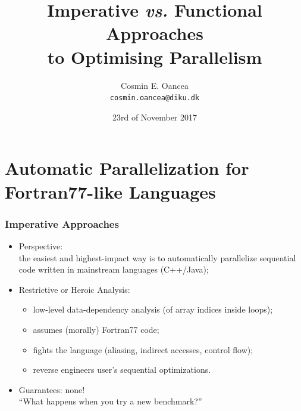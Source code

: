\documentclass{beamer}
\title[]{Imperative {\em vs.} Functional Approaches\\ to Optimising Parallelism}
\author[]{Cosmin E. Oancea\\{\tt cosmin.oancea@diku.dk}}
\institute{Department of Computer Science (DIKU)\\University of Copenhagen}
\date[23/11/2017]{23rd of November 2017}
\newcommand{\emphh}[1]{\textcolor{CosGreen}{ #1}}
\begin{document}
\titleslide

\begin{frame}[fragile]
	\tableofcontents
\end{frame}


\section{Automatic Parallelization for Fortran77-like Languages}

\begin{frame}[fragile,t]
  \frametitle{Imperative Approaches}

\begin{itemize}
    \item \emphh{Perspective:}\\
        the easiest and highest-impact way is to 
        automatically parallelize sequential code 
        written in mainstream languages (C++/Java);
    \bigskip 

    \item \emphh{Restrictive or Heroic Analysis:}
        \begin{itemize}
            \item low-level data-dependency analysis
                    (of array indices inside loops); 
            \item assumes (morally) Fortran77 code;            
            \item fights the language (aliasing, 
                    indirect accesses, control flow);
            \item reverse engineers user's sequential
                    optimizations.
        \end{itemize}
    \bigskip

    \item \emphh{Guarantees:} none!\\
        ``What happens when you try a new benchmark?''
    \bigskip
\end{itemize}

\end{frame}
\end{document}
